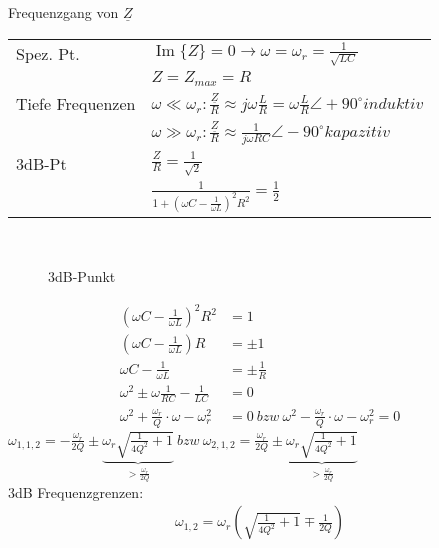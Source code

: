 Frequenzgang von $\underline Z$\\

\newcommand{\arraystretchOriginal}{1.5}
\begin{tabular}{ll}
	Spez. Pt. &
	$\operatorname{Im}{\{Z\}} = 0 \rightarrow \omega = \omega_r=\frac{1}{\sqrt{LC}}$\\
	& $Z = Z_{max} = R$\\
	Tiefe Frequenzen &
	$\omega \ll \omega_r: \frac{\underline Z}{R} \approx
	j\omega\frac{L}{R}=\omega\frac{L}{R} \angle +90^\circ induktiv$\\
	& $\omega \gg \omega_r: \frac{\underline Z}{R} \approx \frac{1}{j\omega RC}
	\angle -90^\circ kapazitiv$\\
	3dB-Pt &
	$\frac{Z}{R}=\frac{1}{\sqrt{2}}$\\
	& $\frac{1}{1+(\omega C-\frac{1}{\omega L})^2R^2}=\frac{1}{2}$\\
\end{tabular}\\

\begin{figure}
	\centering
	
	\caption{3dB-Punkt}
	\label{fig:3dBPunkt}
\end{figure}
\begin{align}
	(\omega C-\frac{1}{\omega L})^2R^2 &= 1\nonumber\\
	(\omega C - \frac{1}{\omega L})R &= \pm 1\nonumber\\
	\omega C - \frac{1}{\omega L} &= \pm \frac{1}{R}\nonumber\\
	\omega^2 \pm \omega \frac{1}{RC}-\frac{1}{LC} &= 0\nonumber\\
	\omega^2 + \frac{\omega_r}{Q}\cdot \omega - \omega_r^2&=0\ bzw\ \omega^2 -
	\frac{\omega_r}{Q}\cdot \omega - \omega_r^2=0\nonumber
	\end{align}
	$\omega_{1,1,2} = -\frac{\omega_r}{2Q} \pm 
	\underbrace{\omega_r\sqrt{\frac{1}{4Q^2}+1}}_{>\frac{\omega_r}{2Q}}
	\	bzw\ \omega_{2,1,2}=\frac{\omega_r}{2Q} \pm
	\underbrace{\omega_r\sqrt{\frac{1}{4Q^2}+1}}_{>\frac{\omega_r}{2Q}} $\\



3dB Frequenzgrenzen:\\
\begin{align}
\boxed{\omega_{1,2}=\omega_r(\sqrt{\frac{1}{4Q^2}+1}\mp\frac{1}{2Q})}
\end{align}
